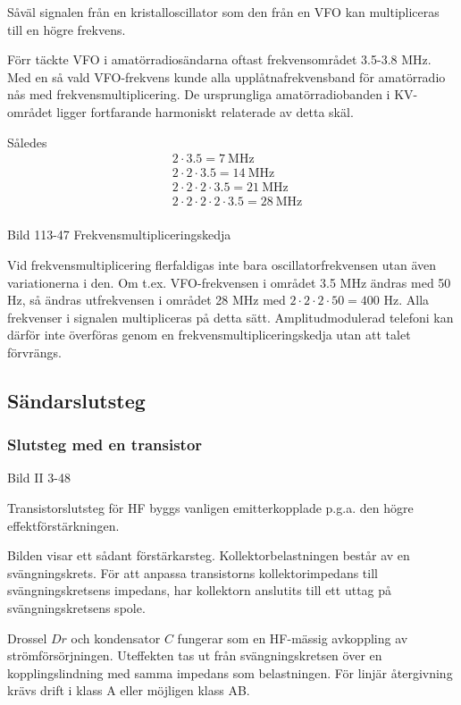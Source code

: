 Såväl signalen från en kristalloscillator som den från en VFO kan
multipliceras till en högre frekvens.

Förr täckte VFO i amatörradiosändarna oftast frekvensområdet 3.5-3.8
MHz. Med en så vald VFO-frekvens kunde alla upplåtnafrekvensband för
amatörradio nås med frekvensmultiplicering. De ursprungliga
amatörradiobanden i KV-området ligger fortfarande harmoniskt
relaterade av detta skäl.

Således
\begin{align*}
  &2 \cdot 3.5 = 7\ \text{MHz} \\
  &2 \cdot 2 \cdot 3.5 = 14\ \text{MHz} \\
  &2 \cdot 2 \cdot 2 \cdot 3.5 = 21\ \text{MHz} \\
  &2 \cdot 2 \cdot 2 \cdot 2 \cdot 3.5 = 28\ \text{MHz} \\
\end{align*}

Bild 113-47 Frekvensmultipliceringskedja

Vid frekvensmultiplicering flerfaldigas inte bara oscillatorfrekvensen
utan även variationerna i den. Om t.ex. VFO-frekvensen i området 3.5
MHz ändras med 50 Hz, så ändras utfrekvensen i området 28 MHz med \(2
\cdot 2 \cdot 2 \cdot 50 = 400\) Hz. Alla frekvenser i signalen
multipliceras på detta sätt. Amplitudmodulerad telefoni kan därför
inte överföras genom en frekvensmultipliceringskedja utan att talet
förvrängs.

\subsection{Sändarslutsteg}

\subsubsection{Slutsteg med en transistor}

Bild II 3-48

Transistorslutsteg för HF byggs vanligen emitterkopplade p.g.a. den
högre effektförstärkningen.

Bilden visar ett sådant förstärkarsteg.  Kollektorbelastningen består
av en svängningskrets. För att anpassa transistorns kollektorimpedans
till svängningskretsens impedans, har kollektorn anslutits till ett
uttag på svängningskretsens spole.

Drossel \(Dr\) och kondensator \(C\) fungerar som en HF-mässig
avkoppling av strömförsörjningen. Uteffekten tas ut från
svängningskretsen över en kopplingslindning med samma impedans som
belastningen. För linjär återgivning krävs drift i klass A eller
möjligen klass AB.

